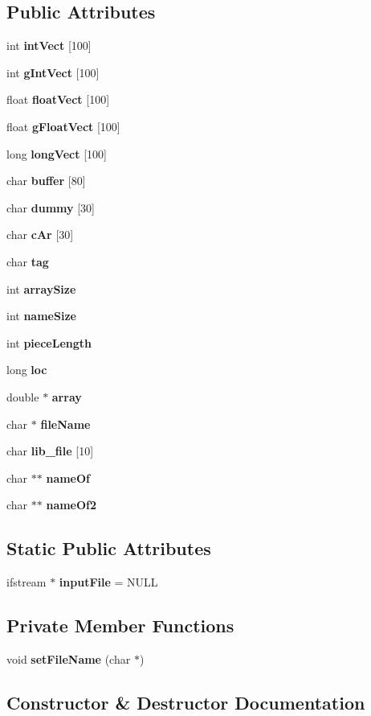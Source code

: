 \subsection*{Public Attributes}
\begin{CompactItemize}
\item 
int {\bf int\-Vect} [100]
\item 
int {\bf g\-Int\-Vect} [100]
\item 
float {\bf float\-Vect} [100]
\item 
float {\bf g\-Float\-Vect} [100]
\item 
long {\bf long\-Vect} [100]
\item 
char {\bf buffer} [80]
\item 
char {\bf dummy} [30]
\item 
char {\bf c\-Ar} [30]
\item 
char {\bf tag}
\item 
int {\bf array\-Size}
\item 
int {\bf name\-Size}
\item 
int {\bf piece\-Length}
\item 
long {\bf loc}
\item 
double $\ast$ {\bf array}
\item 
char $\ast$ {\bf file\-Name}
\item 
char {\bf lib\_\-file} [10]
\item 
char $\ast$$\ast$ {\bf name\-Of}
\item 
char $\ast$$\ast$ {\bf name\-Of2}
\end{CompactItemize}
\subsection*{Static Public Attributes}
\begin{CompactItemize}
\item 
ifstream $\ast$ {\bf input\-File} = NULL
\end{CompactItemize}
\subsection*{Private Member Functions}
\begin{CompactItemize}
\item 
void {\bf set\-File\-Name} (char $\ast$)
\end{CompactItemize}


\subsection{Constructor \& Destructor Documentation}
